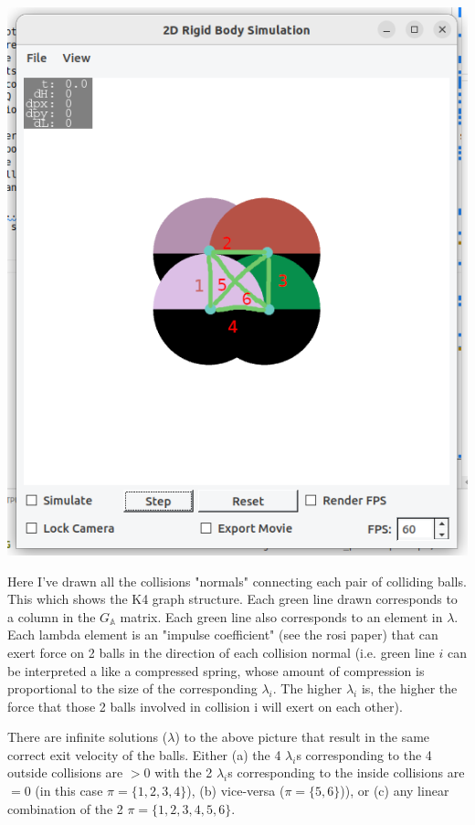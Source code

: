 \documentclass[12pt]{article}
\newcommand{\GA}{G_{\mathbb{A}}}
\begin{document}
\includegraphics[scale=0.5]{K4_2}

Here I've drawn all the collisions "normals" connecting each pair of colliding balls.
This which shows the K4 graph structure. Each green line drawn corresponds to a column in the
$\GA$ matrix. Each green line also corresponds to an element in $\lambda$.
Each lambda element is an "impulse coefficient" (see the rosi paper)
that can exert force on 2 balls in the direction of
each collision normal (i.e. green line $i$ can be interpreted a like a compressed spring,
whose amount of compression is proportional to the size of the corresponding $\lambda_i$.
The higher $\lambda_i$ is, the higher the force that those 2 balls involved in collision i will
exert on each other).

There are infinite solutions ($\lambda$) to the above picture that result in the same correct exit velocity
of the balls. Either
(a) the 4 $\lambda_i$s corresponding to the 4 outside collisions are $> 0$ with the 2 $\lambda_i$s
corresponding to the inside collisions are $= 0$ (in this case $\pi = \{1, 2, 3, 4\}$),
(b) vice-versa ($\pi = \{5, 6\}$)), or 
(c) any linear combination of the 2 $\pi = \{1, 2, 3, 4, 5, 6\}$.
\end{document}
